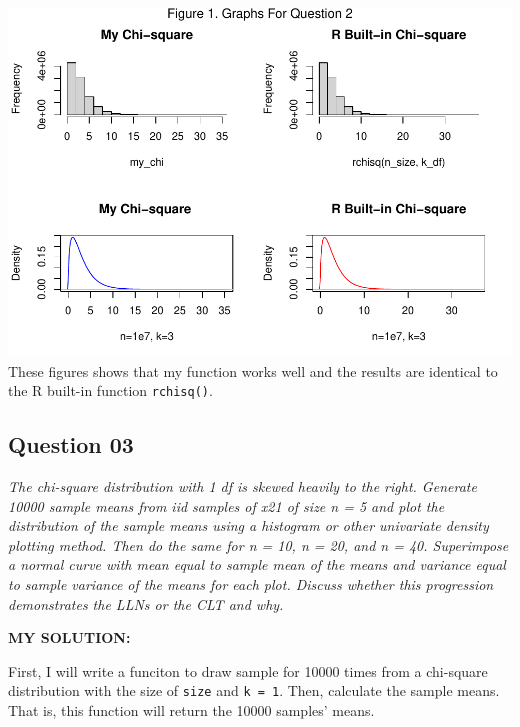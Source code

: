 \documentclass[
]{article}
\begin{document}
\includegraphics[width=1\linewidth,height=0.7\textheight]{homework_01_solutions_files/figure-latex/unnamed-chunk-2-1}
These figures shows that my function works well and the results are
identical to the R built-in function \texttt{rchisq()}.

\hypertarget{question-03}{%
\subsection{Question 03}\label{question-03}}

\emph{The chi-square distribution with 1 df is skewed heavily to the
right. Generate 10000 sample means from iid samples of x21 of size n = 5
and plot the distribution of the sample means using a histogram or other
univariate density plotting method. Then do the same for n = 10, n = 20,
and n = 40. Superimpose a normal curve with mean equal to sample mean of
the means and variance equal to sample variance of the means for each
plot. Discuss whether this progression demonstrates the LLNs or the CLT
and why.}

\textbf{MY SOLUTION:}

First, I will write a funciton to draw sample for 10000 times from a
chi-square distribution with the size of \texttt{size} and
\texttt{k\ =\ 1}. Then, calculate the sample means. That is, this
function will return the 10000 samples' means.
\end{document}
